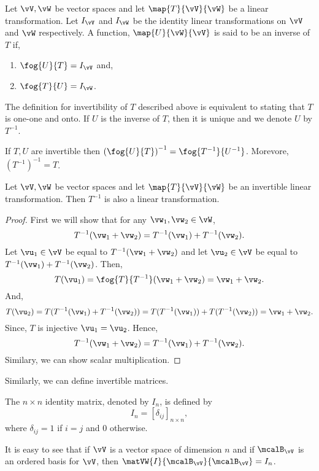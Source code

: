 \begin{Definition}
    Let $\vV,\vW$ be vector spaces and let $\map{T}{\vV}{\vW}$ be a linear transformation. Let $I_{\vV}$ and
    $I_{\vW}$ be the identity linear transformations on $\vV$ and $\vW$ respectively. A function,
    $\map{U}{\vW}{\vV}$ is said to be an inverse of $T$ if,
    \begin{enumerate}
	\item
	    $\fog{U}{T} = I_{\vV}$ and,
	\item
	    $\fog{T}{U} = I_{\vW}$.
    \end{enumerate}
\end{Definition}
\begin{Remark}
    The definition for invertibility of $T$ described above is equivalent to stating that $T$ is one-one and
    onto. If $U$ is the inverse of $T$, then it is unique and we denote $U$ by $T^{-1}$.
\end{Remark}
\begin{Remark}
    If $T,U$ are invertible then ${(\fog{U}{T})}^{-1} = \fog{T^{-1}}{U^{-1}}$. Morevore, ${(T^{-1})}^{-1} =
    T$.
\end{Remark}
\begin{Theorem}
    Let $\vV,\vW$ be vector spaces and let $\map{T}{\vV}{\vW}$ be an invertible linear transformation. Then
    $T^{-1}$ is also a linear transformation.
\end{Theorem}
\begin{proof}
    First we will show that for any $\vw_1,\vw_2 \in \vW$, 
    \[T^{-1}(\vw_1 + \vw_2) = T^{-1}(\vw_1) + T^{-1}(\vw_2).\]
    Let $\vu_1 \in \vV $ be equal to $T^{-1}(\vw_1 + \vw_2)$ and let $\vu_2 \in \vV$ be equal to 
    $T^{-1}(\vw_1) + T^{-1}(\vw_2)$. Then,
    \[T(\vu_1) = \fog{T}{T^{-1}}(\vw_1 + \vw_2) = \vw_1 + \vw_2.\]
    And,
    \[T(\vu_2) = T(T^{-1}(\vw_1) + T^{-1}(\vw_2)) = T(T^{-1}(\vw_1)) + T(T^{-1}(\vw_2)) = \vw_1 + \vw_2.\]
    Since, $T$ is injective $\vu_1 = \vu_2$. Hence, 
    \[T^{-1}(\vw_1 + \vw_2) = T^{-1}(\vw_1) + T^{-1}(\vw_2).\]
    Similary, we can show scalar multiplication.
\end{proof}
Similarly, we can define invertible matrices.
\begin{Definition}
    The $n\times n$ identity matrix, denoted by $I_n$, is defined by \[I_n = {[\delta_{ij}]}_{n\times n},\]
    where $\delta_{ij} = 1$ if $i = j$ and $0$ otherwise.
\end{Definition}
\begin{Remark}
    It is easy to see that if $\vV$ is a vector space of dimension $n$ and if $\mcalB_{\vV}$ is an ordered
    basis for $\vV$, then $\matVW{I}{\mcalB_{\vV}}{\mcalB_{\vV}} = I_n$.
\end{Remark}
